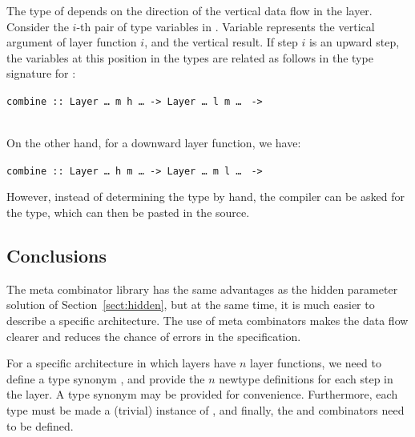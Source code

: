 \documentclass[preprint,natbib]{sigplanconf}
\begin{document}
The type of  depends on the direction of the vertical data flow in the layer. Consider the $i$-th pair of  type variables in . Variable  represents the vertical argument of layer function $i$, and  the vertical result. If step $i$ is an upward step, the variables at this position in the  types are related as follows in the type signature for :

\begin{small}
\begin{tabbing}
{\tt  combine :: }\={\tt Layer \dots~m h \dots}\verb| -> |{\tt Layer \dots~l m \dots} \verb| ->|\\
                  \\
\end{tabbing}
\end{small}

On the other hand, for a downward layer function, we have:

\begin{small}
\begin{tabbing}
{\tt  combine :: }\={\tt Layer \dots~h m \dots}\verb| -> |{\tt Layer \dots~m l \dots} \verb| ->|\\
\end{tabbing}
\end{small}

However, instead of determining the type by hand, the compiler can be asked for the type, which can then be pasted in the source.



\subsection{Conclusions} 

The meta combinator library has the same advantages as the hidden parameter solution of Section~\ref{sect:hidden}, but at the same time, it is much easier to describe a specific architecture. The use of meta combinators makes the data flow clearer and reduces the chance of errors in the specification.

For a specific architecture in which layers have $n$ layer functions, we need to define a type synonym , and provide the $n$ newtype definitions  for each step in the layer. A type synonym  may be provided for convenience. Furthermore, each type  must be made a (trivial) instance of , and finally, the  and  combinators need to be defined.
\end{document}
